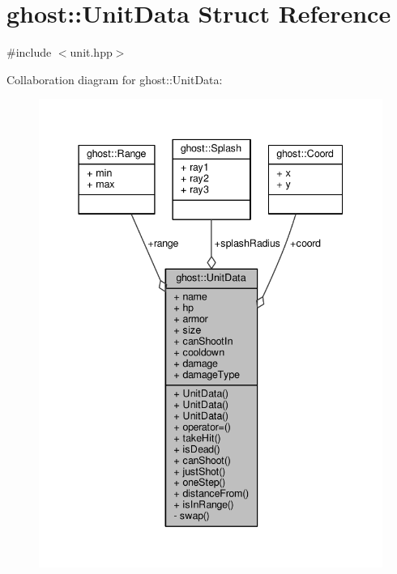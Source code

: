 \hypertarget{structghost_1_1UnitData}{\section{ghost\-:\-:Unit\-Data Struct Reference}
\label{structghost_1_1UnitData}
}


{\ttfamily \#include $<$unit.\-hpp$>$}



Collaboration diagram for ghost\-:\-:Unit\-Data\-:
\nopagebreak
\begin{figure}[H]
\begin{center}
\leavevmode
\includegraphics[width=340pt]{structghost_1_1UnitData__coll__graph}
\end{center}
\end{figure}
